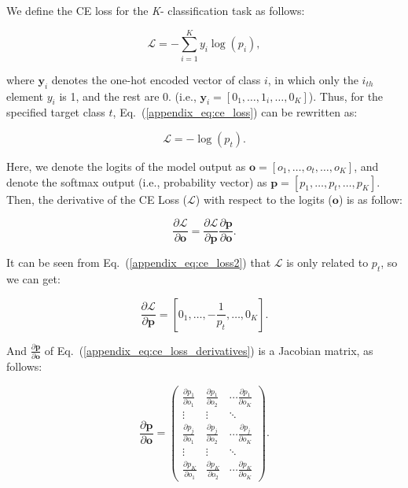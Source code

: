 \documentclass[letterpaper]{article} %
\newcommand{\Eref}[1]{Eq.~(\ref{#1})}
\begin{document}
We define the CE loss for the \emph{K}-
classification task as follows:
\begin{linenomath*}
\begin{equation}\label{appendix_eq:ce_loss}
    \mathcal{L}=-\sum_{i=1}^{K} y_i \log \left(p_{i}\right),
\end{equation}
\end{linenomath*}
where $\mathbf{y}_i$ denotes the one-hot encoded vector of class $i$, in which only the $i_{th}$ element $y_i$ is 1, and the rest are 0. (i.e., $\mathbf{y}_i=[0_1,\dots,1_i,\dots,0_K]$). Thus, for the specified target class $t$, \Eref{appendix_eq:ce_loss} can be rewritten as:
\begin{linenomath*}
\begin{equation}\label{appendix_eq:ce_loss2}
    \mathcal{L}= -\log(p_t).
\end{equation}
\end{linenomath*}
Here, we denote the logits of the model output as  $\mathbf{o}=[o_1,\dots,o_t,\dots,o_K]$, and denote the softmax output (i.e., probability vector) as $\mathbf{p}=[p_1,\dots,p_t,\dots,p_K]$. Then, the derivative of the CE Loss ($\mathcal{L}$) with respect to the logits ($\mathbf{o}$) is as follow:
\begin{linenomath*}
\begin{equation}\label{appendix_eq:ce_loss_derivatives}
    \frac{\partial \mathcal{L}}{\partial \mathbf{o}}=\frac{\partial \mathcal{L}}{\partial{\mathbf{p}}}\frac{\partial \mathbf{p}}{\partial{\mathbf{o}}}.
\end{equation}
\end{linenomath*}
It can be seen from \Eref{appendix_eq:ce_loss2} that $\mathcal{L}$ is only related to $p_t$, so we can get:
\begin{linenomath*}
\begin{equation}
    \frac{\partial \mathcal{L}}{\partial \mathbf{p}}=\left[0_{1},\dots,-\frac{1}{p_t},\dots,0_{K}\right].
\end{equation}
\end{linenomath*}
And $\frac{\partial \mathbf{p}}{\partial \mathbf{o}}$ of \Eref{appendix_eq:ce_loss_derivatives} is a Jacobian matrix, as follows:
\begin{linenomath*}
\begin{equation}\label{appendix_eq:Jacobian_matrix}
    \frac{\partial \boldsymbol{p}}{\partial \boldsymbol{o}}=\left(\begin{array}{ccc}
    \frac{\partial p_{1}}{\partial o_{1}} & \frac{\partial p_{1}}{\partial o_{2}} & \cdots \frac{\partial p_{1}}{\partial o_{K}} \\
    \vdots & \vdots & \ddots \\
    \frac{\partial p_{j}}{\partial o_{1}} & \frac{\partial p_{j}}{\partial o_{2}} & \cdots \frac{\partial p_{j}}{\partial o_{K}} \\
    \vdots & \vdots & \ddots \\
    \frac{\partial p_{K}}{\partial o_{1}} & \frac{\partial p_{K}}{\partial o_{2}} & \cdots \frac{\partial p_{K}}{\partial o_{K}}
    \end{array}\right).
\end{equation}
\end{linenomath*}
\end{document}
